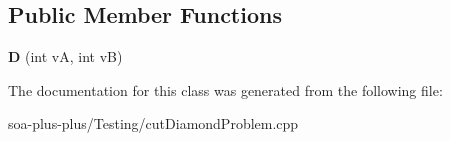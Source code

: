 \subsection*{Public Member Functions}
\begin{DoxyCompactItemize}
\item 
\hypertarget{class_d_a714c110f4f5cd669e90145d0e091455a}{
{\bfseries D} (int vA, int vB)}
\label{class_d_a714c110f4f5cd669e90145d0e091455a}

\end{DoxyCompactItemize}


The documentation for this class was generated from the following file:\begin{DoxyCompactItemize}
\item 
soa-\/plus-\/plus/Testing/cutDiamondProblem.cpp\end{DoxyCompactItemize}
